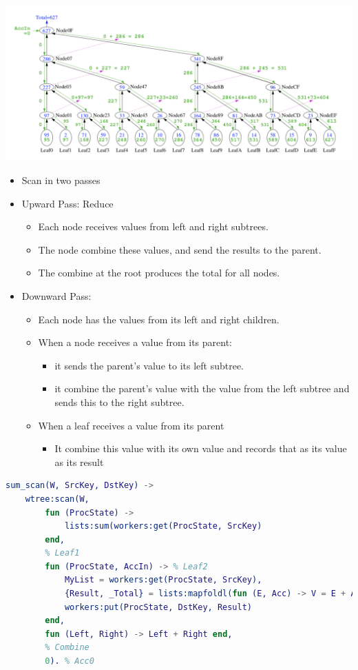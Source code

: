 \documentclass[../main.tex]{subfiles}
\begin{document}
\begin{center}
	\includegraphics[scale=0.5]{images/scan.png}
\end{center}

\begin{itemize}
	\item Scan in two passes
	\item Upward Pass: Reduce
	      \begin{itemize}
		      \item Each node receives values from left and right subtrees.
		      \item The node combine these values, and send the results to the parent.
		      \item The combine at the root produces the total for all nodes.
	      \end{itemize}
	\item Downward Pass:
	      \begin{itemize}
		      \item Each node has the values from its left and right children.
		      \item When a node receives a value from its parent:
		            \begin{itemize}
			            \item it sends the parent's value to its left subtree.
			            \item it combine the parent's value with the value from the left subtree and sends this to the right subtree.
		            \end{itemize}
		      \item When a leaf receives a value from its parent
		            \begin{itemize}
			            \item It combine this value with its own value and records that as its value as its result
		            \end{itemize}
	      \end{itemize}
\end{itemize}

\begin{lstlisting}[language=erlang]
    sum_scan(W, SrcKey, DstKey) ->
    wtree:scan(W,
        fun (ProcState) ->
            lists:sum(workers:get(ProcState, SrcKey)
        end,
        % Leaf1
        fun (ProcState, AccIn) -> % Leaf2
            MyList = workers:get(ProcState, SrcKey),
            {Result, _Total} = lists:mapfoldl(fun (E, Acc) -> V = E + Acc, {V, V} end, AccIn, MyList),
            workers:put(ProcState, DstKey, Result)
        end,
        fun (Left, Right) -> Left + Right end,
        % Combine
        0). % Acc0
\end{lstlisting}
\end{document}
